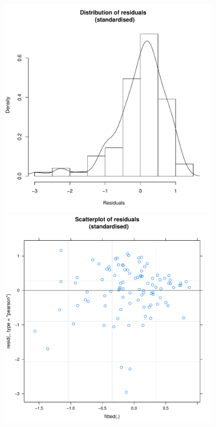 \begin{CJK}{UTF8}{gbsn}
\begin{figure}[htbp]
   \includegraphics[scale =.4]{images/MLM3bHist.pdf}
        \includegraphics[scale =.4]{images/MLM3bScatter.pdf}

\end{figure}
\end{CJK}

